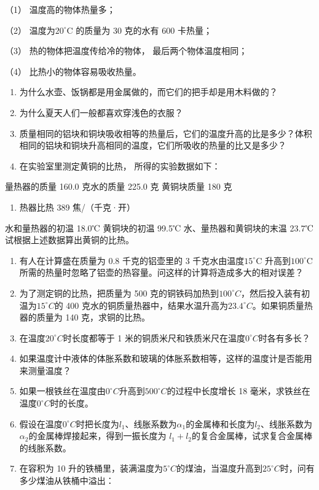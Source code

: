 （1） 温度高的物体热量多；

（2） 温度为\(20^{\circ}\)C 的质量为 30 克的水有 600 卡热量；

（3） 热的物体把温度传给冷的物体， 最后两个物体温度相同；

（4） 比热小的物体容易吸收热量。

\begin{enumerate}
\def\labelenumi{\arabic{enumi}.}
\setcounter{enumi}{1}
\item
  为什么水壶、饭锅都是用金属做的，而它们的把手却是用木料做的？
\item
  为什么夏天人们一般都喜欢穿浅色的衣服？
\item
  质量相同的铝块和铜块吸收相等的热量后，它们的温度升高的比是多少？体积相同的铝块和铜块升高相同的温度，它们所吸收的热量的比又是多少？
\item
  在实验室里测定黄铜的比热， 所得的实验数据如下：
\end{enumerate}

量热器的质量 160.0 克水的质量 225.0 克 黄铜块质量 180 克

\begin{enumerate}
\def\labelenumi{\arabic{enumi}.}
\tightlist
\item
  热器比热 389 焦/（千克·开）
\end{enumerate}

水和量热器的初温 18.0℃ 黄铜块的初温 99.5℃ 水、量热器和黄铜块的末温 23.7℃
试根据上述数据算出黄铜的比热。

\begin{enumerate}
\def\labelenumi{\arabic{enumi}.}
\setcounter{enumi}{5}
\item
  有人在计算盛在质量为 0.8 千克的铝壶里的 3 千克水由温度\(15^{\circ}\)C
  升高到\(100^{\circ}\)C
  所需的热量时忽略了铝壶的热容量。问这样的计算将造成多大的相对误差？
\item
  为了测定铜的比热，把质量为 500
  克的铜铁码加热到\(100^{\circ}C\)，然后投入装有初温为\(15^{\circ}C\)的
  400
  克水的铜质量热器中，结果水温升高为\(23.4^{\circ}C\)。如果铜质量热器的质量为
  140 克，求铜的比热。
\item
  在温度\(20^{\circ}C\)时长度都等于 1
  米的铜质米尺和铁质米尺在温度\(0^{\circ}C\)时各有多长？
\item
  如果温度计中液体的体胀系数和玻璃的体胀系数相等，这样的温度计是否能用来测量温度？
\item
  如果一根铁丝在温度由\(0^{\circ}C\)升高到\(500^{\circ}C\)的过程中长度增长
  18 毫米，求铁丝在温度\(0^{\circ}C\)时的长度。
\item
  假设在温度\(0^{\circ}C\)时把长度为\(l_{1}\)、线胀系数为\(\alpha_{1}\)的金属棒和长度为\(l_{2}\)、线胀系数为\(\alpha_{2}\)的金属棒焊接起来，得到一振长度为
  \(l_{1}+l_{2}\)的复合金属棒，试求复合金属棒的线胀系数。
\item
  在容积为 10
  升的铁桶里，装满温度为\(5^{\circ}C\)的煤油，当温度升高到\(25^{\circ}C\)时，问有多少煤油从铁桶中溢出：
\end{enumerate}

